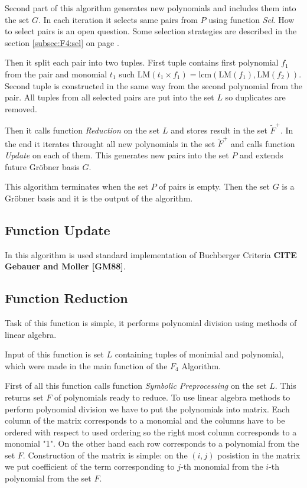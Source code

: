 Second part of this algorithm generates new polynomials and includes them into the set $G$. In each iteration it selects same pairs from $P$ using function \textit{Sel}. How to select pairs is an open question. Some selection strategies are described in the section \ref{subsec:F4:sel} on page \pageref{subsec:F4:sel}.

Then it split each pair into two tuples. First tuple contains first polynomial $f_1$ from the pair and monomial $t_1$ such $\textrm{LM}(t_1 \times f_1) = \textrm{lcm}(\textrm{LM}(f_1),\textrm{LM}(f_2))$. Second tuple is constructed in the same way from the second polynomial from the pair. All tuples from all selected pairs are put into the set $L$ so duplicates are removed.

Then it calls function \textit{Reduction} on the set $L$ and stores result in the set $\tilde{F}^+$. In the end it iterates throught all new polynomials in the set $\tilde{F}^+$ and calls function \textit{Update} on each of them. This generates new pairs into the set $P$ and extends future Gr\"obner basis $G$.

This algorithm terminates when the set $P$ of pairs is empty. Then the set $G$ is a Gr\"obner basis and it is the output of the algorithm.

\subsection{Function Update}
In this algorithm is used standard implementation of Buchberger Criteria \textbf{CITE Gebauer and Moller [GM88]}.

\subsection{Function Reduction}
Task of this function is simple, it performs polynomial division using methods of linear algebra.

Input of this function is set $L$ containing tuples of monimial and polynomial, which were made in the main function of the $F_4$ Algorithm.

First of all this function calls function \textit{Symbolic Preprocessing} on the set $L$. This returns set $F$ of polynomials ready to reduce. To use linear algebra methods to perform polynomial division we have to put the polynomials into matrix. Each column of the matrix corresponds to a monomial and the columns have to be ordered with respect to used ordering so the right most column corresponds to a monomial "1". On the other hand each row corresponds to a polynomial from the set $F$. Construction of the matrix is simple: on the $(i, j)$ posistion in the matrix we put coefficient of the term corresponding to $j$-th monomial from the $i$-th polynomial from the set $F$.

